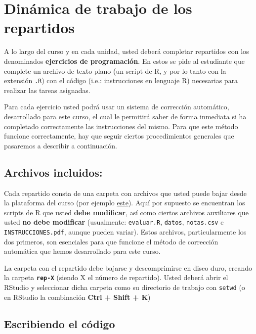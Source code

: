 \documentclass[]{article}
\begin{document}
\section{Dinámica de trabajo de los repartidos}

A lo largo del curso y en cada unidad, usted deberá completar repartidos
con los denominados \textbf{ejercicios de programación}. En estos se
pide al estudiante que complete un archivo de texto plano (un script de
R, y por lo tanto con la extensión \texttt{.R}) con el código (i.e.:
instrucciones en lenguaje R) necesarias para realizar las tareas
asignadas.

Para cada ejercicio usted podrá usar un sistema de corrección
automático, desarrollado para este curso, el cual le permitirá saber de
forma inmediata si ha completado correctamente las instrucciones del
mismo. Para que este método funcione correctamente, hay que seguir
ciertos procedimientos generales que pasaremos a describir a
continuación.

\subsection{Archivos incluidos:}

Cada repartido consta de una carpeta con archivos que usted puede bajar
desde la plataforma del curso (por ejemplo
\href{http://eva.universidad.edu.uy/file.php/1454/ejercicios\_de\_programacion/rep-1.zip}{este}).
Aquí por supuesto se encuentran los scripts de R que usted \textbf{debe
modificar}, así como ciertos archivos auxiliares que usted \textbf{no
debe modificar} (usualmente: \texttt{evaluar.R}, \texttt{datos},
\texttt{notas.csv} e \texttt{INSTRUCCIONES.pdf}, aunque pueden variar).
Estos archivos, particularmente los dos primeros, son esenciales para
que funcione el método de corrección automática que hemos desarrollado
para este curso.

La carpeta con el repartido debe bajarse y descomprimirse en disco duro,
creando la carpeta \textbf{\texttt{rep-X}} (siendo X el número de
repartido). Usted deberá abrir el RStudio y seleccionar dicha carpeta
como su directorio de trabajo con \texttt{setwd} (o en RStudio la
combinación \textbf{Ctrl + Shift + K})

\subsection{Escribiendo el código}
\end{document}
